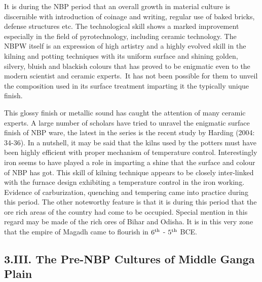 It is during the NBP period that an overall growth in material culture is discernible with introduction of coinage and writing, regular use of baked bricks, defense structures etc. The technological skill shows a marked improvement especially in the field of pyrotechnology, including ceramic technology. The NBPW itself is an expression of high artistry and a highly evolved skill in the kilning and potting techniques with its uniform surface and shining golden, silvery, bluish and blackish colours that has proved to be enigmatic even to the modern scientist and ceramic experts.~It has not been possible for them to unveil the composition used in its surface treatment imparting it the typically unique finish.

This glossy finish or metallic sound has caught the attention of many ceramic experts. A large number of scholars have tried to unravel the enigmatic surface finish of NBP ware, the latest in the series is the recent study by Harding (2004: 34-36). In a nutshell, it may be said that the kilns used by the potters must have been highly efficient with proper mechanism of temperature control. Interestingly iron seems to have played a role in imparting a shine that the surface and colour of NBP has got.  This skill of kilning technique appears to be closely inter-linked with the furnace design exhibiting a temperature control in the iron working. Evidence of carburization, quenching and tempering came into practice during this period. The other noteworthy feature is that it is during this period that the ore rich areas of the country had come to be occupied. Special mention in this regard may be made of the rich ores of Bihar and Odisha. It is in this very zone that the empire of Magadh came to flourish in $6^{\rm th}$ - $5^{\rm th}$ BCE.

\vspace{-.3cm}

\subsection*{3.III. The Pre-NBP Cultures of Middle Ganga Plain}\label{subsection-10}

